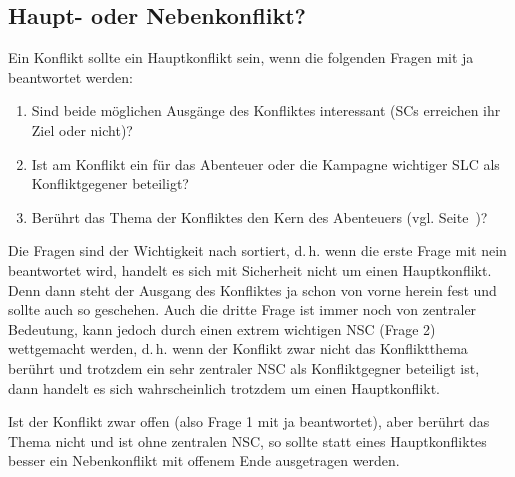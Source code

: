 \subsection{Haupt- oder Nebenkonflikt?}
Ein Konflikt sollte ein Hauptkonflikt sein, wenn die folgenden Fragen mit ja beantwortet werden:
\begin{enumerate}
	\item Sind beide möglichen Ausgänge des Konfliktes interessant (SCs erreichen ihr Ziel oder nicht)?
	\item Ist am Konflikt ein für das Abenteuer oder die Kampagne wichtiger SLC als Konfliktgegener beteiligt?
	\item Berührt das Thema der Konfliktes den Kern des Abenteuers (vgl. Seite~\pageref{subsec:DerKernDesAbenteuers})?
\end{enumerate}
Die Fragen sind der Wichtigkeit nach sortiert, d.\,h. wenn die erste Frage mit nein beantwortet wird, handelt es sich mit Sicherheit nicht um einen Hauptkonflikt. Denn dann steht der Ausgang des Konfliktes ja schon von vorne herein fest und sollte auch so geschehen. Auch die dritte Frage ist immer noch von zentraler Bedeutung, kann jedoch durch einen extrem wichtigen NSC (Frage 2) wettgemacht werden, d.\,h. wenn der Konflikt zwar nicht das Konfliktthema berührt und trotzdem ein sehr zentraler NSC als Konfliktgegner beteiligt ist, dann handelt es sich wahrscheinlich trotzdem um einen Hauptkonflikt.

Ist der Konflikt zwar offen (also Frage 1 mit ja beantwortet), aber berührt das Thema nicht und ist ohne zentralen NSC, so sollte statt eines Hauptkonfliktes besser ein Nebenkonflikt mit offenem Ende ausgetragen werden.

